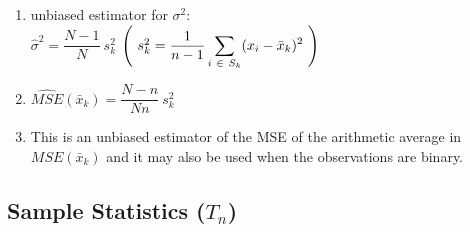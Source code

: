 \begin{enumerate}
    \item unbiased estimator for $\sigma^2$: \\
    $
       \hat{\sigma}^2 = \dfrac{N - 1}{N}\ s^2_k
    $
    \hfill
    $
        \left(\
            s^2_k = \dfrac{1}{n - 1} \displaystyle\sum_{i\ \in\ S_k} (x_i - \bar{x}_k )^2
        \ \right)
    $
    \hfill \cite{statistics/book/Statistics-for-Data-Scientists/Maurits-Kaptein}

    \item $
        \hat{MSE}(\bar{x}_k)
        = \dfrac{N - n}{N n}\ s^2_k
    $
    \hfill \cite{statistics/book/Statistics-for-Data-Scientists/Maurits-Kaptein}

    \item This is an unbiased estimator of the MSE of the arithmetic average in $MSE(\bar{x}_k)$ and it may also be used when the observations are binary.
    \hfill \cite{statistics/book/Statistics-for-Data-Scientists/Maurits-Kaptein}


\end{enumerate}




\subsection{Sample Statistics ($T_n$)}


